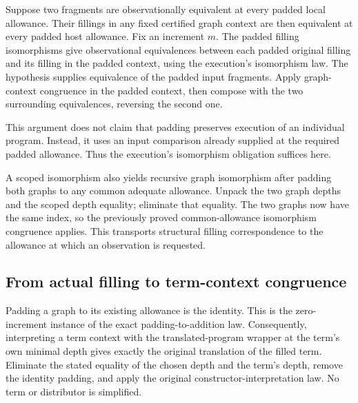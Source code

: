 
Suppose two fragments are observationally equivalent at every padded local
allowance. Their fillings in any fixed certified graph context are then
equivalent at every padded host allowance. Fix an increment $m$. The padded
filling isomorphisms give observational equivalences between each padded
original filling and its filling in the padded context, using the execution's
isomorphism law. The hypothesis supplies equivalence of the padded input
fragments. Apply graph-context congruence in the padded context, then compose
with the two surrounding equivalences, reversing the second one.

This argument does not claim that padding preserves execution of an individual
program. Instead, it uses an input comparison already supplied at the required
padded allowance. Thus the execution's isomorphism obligation suffices here.



A scoped isomorphism also yields recursive graph isomorphism after padding
both graphs to any common adequate allowance. Unpack the two graph depths and
the scoped depth equality; eliminate that equality. The two graphs now have
the same index, so the previously proved common-allowance isomorphism congruence
applies. This transports structural filling correspondence to the allowance
at which an observation is requested.



\subsection{From actual filling to term-context congruence}

Padding a graph to its existing allowance is the identity. This is the
zero-increment instance of the exact padding-to-addition law. Consequently,
interpreting a term context with the translated-program wrapper at the term's
own minimal depth gives exactly the original translation of the filled term.
Eliminate the stated equality of the chosen depth and the term's depth, remove
the identity padding, and apply the original constructor-interpretation law.
No term or distributor is simplified.



